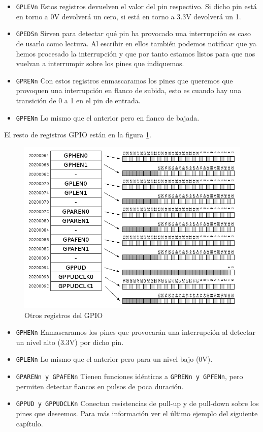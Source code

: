 \begin{itemize}
  \item {\tt GPLEVn} Estos registros devuelven el valor del pin respectivo. Si dicho pin está
        en torno a 0V devolverá un cero, si está en torno a 3.3V devolverá un 1.
  \item {\tt GPEDSn} Sirven para detectar qué pin ha provocado una interrupción es caso de
        usarlo como lectura. Al escribir en ellos también podemos notificar que ya hemos procesado
        la interrupción y que por tanto estamos listos para que nos vuelvan a interrumpir sobre
        los pines que indiquemos.
  \item {\tt GPRENn} Con estos registros enmascaramos los pines que queremos que provoquen una
        interrupción en flanco de subida, esto es cuando hay una transición de 0 a 1 en el pin
        de entrada.
  \item {\tt GPFENn} Lo mismo que el anterior pero en flanco de bajada.
\end{itemize}

El resto de registros GPIO están en la figura \ref{fig:gpio3}.

\begin{figure}[h]
  \centering
    \includegraphics[width=14cm]{graphs/gpio3.png}
  \caption{Otros registros del GPIO}
  \label{fig:gpio3}
\end{figure}

\begin{itemize}
  \item {\tt GPHENn} Enmascaramos los pines que provocarán una interrupción al detectar un
        nivel alto (3.3V) por dicho pin.
  \item {\tt GPLENn} Lo mismo que el anterior pero para un nivel bajo (0V).
  \item {\tt GPARENn y GPAFENn} Tienen funciones idénticas a {\tt GPRENn y GPFENn}, pero permiten
        detectar flancos en pulsos de poca duración.
  \item {\tt GPPUD y GPPUDCLKn} Conectan resistencias de pull-up y de pull-down sobre los pines
        que deseemos. Para más información ver el último ejemplo del siguiente capítulo.
\end{itemize}

